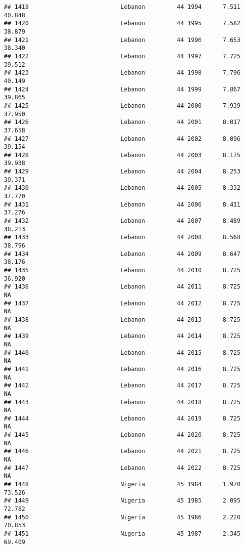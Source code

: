 \documentclass[
]{article}
\begin{document}
\begin{verbatim}
## 1419                          Lebanon         44 1994      7.511     40.848
## 1420                          Lebanon         44 1995      7.582     38.879
## 1421                          Lebanon         44 1996      7.653     38.340
## 1422                          Lebanon         44 1997      7.725     39.512
## 1423                          Lebanon         44 1998      7.796     40.149
## 1424                          Lebanon         44 1999      7.867     39.865
## 1425                          Lebanon         44 2000      7.939     37.950
## 1426                          Lebanon         44 2001      8.017     37.658
## 1427                          Lebanon         44 2002      8.096     39.154
## 1428                          Lebanon         44 2003      8.175     39.938
## 1429                          Lebanon         44 2004      8.253     39.371
## 1430                          Lebanon         44 2005      8.332     37.770
## 1431                          Lebanon         44 2006      8.411     37.276
## 1432                          Lebanon         44 2007      8.489     38.213
## 1433                          Lebanon         44 2008      8.568     38.796
## 1434                          Lebanon         44 2009      8.647     38.176
## 1435                          Lebanon         44 2010      8.725     36.920
## 1436                          Lebanon         44 2011      8.725         NA
## 1437                          Lebanon         44 2012      8.725         NA
## 1438                          Lebanon         44 2013      8.725         NA
## 1439                          Lebanon         44 2014      8.725         NA
## 1440                          Lebanon         44 2015      8.725         NA
## 1441                          Lebanon         44 2016      8.725         NA
## 1442                          Lebanon         44 2017      8.725         NA
## 1443                          Lebanon         44 2018      8.725         NA
## 1444                          Lebanon         44 2019      8.725         NA
## 1445                          Lebanon         44 2020      8.725         NA
## 1446                          Lebanon         44 2021      8.725         NA
## 1447                          Lebanon         44 2022      8.725         NA
## 1448                          Nigeria         45 1984      1.970     73.526
## 1449                          Nigeria         45 1985      2.095     72.782
## 1450                          Nigeria         45 1986      2.220     70.853
## 1451                          Nigeria         45 1987      2.345     69.409

\end{verbatim}
\end{document}
